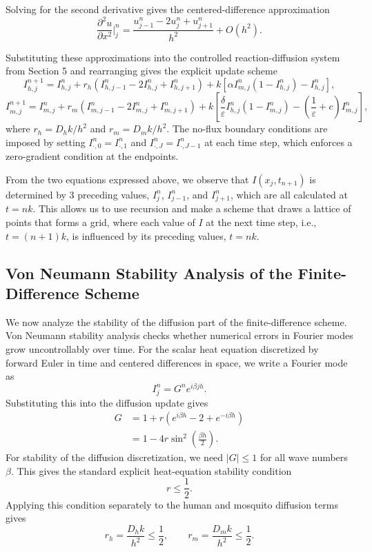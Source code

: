 \documentclass[12pt]{article}
\begin{document}
Solving for the second derivative gives the centered-difference approximation
\[
\frac{\partial^2u}{\partial x^2}\bigg|^n_j
=
\frac{u^n_{j-1} - 2u^n_j + u^n_{j+1}}{h^2} + O(h^2).
\]

Substituting these approximations into the controlled reaction-diffusion system from Section 5 and
rearranging gives the explicit update scheme
\[
I^{n+1}_{h,j}
=
I^n_{h,j}
+
r_h
\left(
I^n_{h,j-1} - 2I^n_{h,j} + I^n_{h,j+1}
\right)
+
k\left[
\alpha I^n_{m,j}
\left(1-I^n_{h,j}\right)
-
I^n_{h,j}
\right],
\]
\[
I^{n+1}_{m,j}
=
I^n_{m,j}
+
r_m
\left(
I^n_{m,j-1} - 2I^n_{m,j} + I^n_{m,j+1}
\right)
+
k\left[
\frac{\delta}{\varepsilon} I^n_{h,j}
\left(1-I^n_{m,j}\right)
-
\left(\frac{1}{\varepsilon}+c\right)I^n_{m,j}
\right],
\]
where \(r_h = D_hk/h^2\) and \(r_m = D_mk/h^2\). The no-flux boundary conditions are imposed by
setting \(I^n_{\cdot,0} = I^n_{\cdot,1}\) and \(I^n_{\cdot,J} = I^n_{\cdot,J-1}\) at each time step, which enforces a zero-gradient condition
at the endpoints.

From the two equations expressed above, we observe that \(I(x_j , t_{n+1})\) is determined by 3
preceding values, \(I^n_j\), \(I^n_{j-1}\), and \(I^n_{j+1}\), which are all calculated at \(t = nk\). This allows us to
use recursion and make a scheme that draws a lattice of points that forms a grid, where
each value of \(I\) at the next time step, i.e., \(t = (n + 1)k\), is influenced by its preceding values,
\(t = nk\).

\subsection{Von Neumann Stability Analysis of the Finite-Difference Scheme}

We now analyze the stability of the diffusion part of the finite-difference scheme. Von Neumann stability analysis checks whether numerical errors in Fourier modes grow uncontrollably over time. For the scalar heat equation discretized by forward Euler in time and centered differences in space, we write a Fourier mode as
\[
I_j^n=G^n e^{i\beta jh}.
\]
Substituting this into the diffusion update gives
\begin{align}
G &= 1+r\left(e^{i\beta h}-2+e^{-i\beta h}\right)\\
&=1-4r\sin^2\left(\frac{\beta h}{2}\right).
\end{align}
For stability of the diffusion discretization, we need \(|G|\leq 1\) for all wave numbers \(\beta\). This gives the standard explicit heat-equation stability condition
\[
r\leq \frac{1}{2}.
\]
Applying this condition separately to the human and mosquito diffusion terms gives
\begin{equation}
\label{eq:stability}
r_h=\frac{D_hk}{h^2}\leq \frac{1}{2},
\qquad
r_m=\frac{D_mk}{h^2}\leq \frac{1}{2}.
\end{equation}
\end{document}
